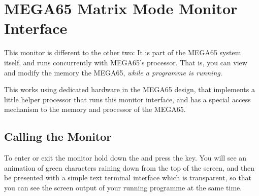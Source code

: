 \section{MEGA65 Matrix Mode Monitor Interface}

This monitor is different to the other two: It is part of the MEGA65
system itself, and runs concurrently with MEGA65's processor. That is,
you can view and modify the memory the MEGA65, {\em while a programme is running}.

This works using dedicated hardware in the MEGA65 design, that implements a little
helper processor that runs this monitor interface, and has a special access mechanism
to the memory and processor of the MEGA65.

\subsection {Calling the Monitor}

To enter or exit the monitor hold down the \megasymbolkey and press the  key.
You will see an animation of green characters raining down from the top of the screen, and
then be presented with a simple text terminal interface which is transparent, so that you can
see the screen output of your running programme at the same time.

